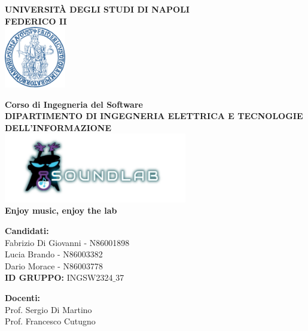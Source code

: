 \documentclass{article}
\begin{document}
	\begin{center}
		\textbf{UNIVERSITÀ DEGLI STUDI DI NAPOLI \\ FEDERICO II}
		\\
		\vspace{1cm}
		\includegraphics[width=0.2\textwidth]{Immagini/logo_universita.png} 
	\end{center}
	
	\vspace{1cm}
	
	\begin{center}
		\textbf{Corso di Ingegneria del Software} \\
		\vspace{0.5cm}
		\textbf{DIPARTIMENTO DI INGEGNERIA ELETTRICA E TECNOLOGIE DELL'INFORMAZIONE} \\
		\vspace{0.5cm}
		\includegraphics[width=0.6\textwidth]{Immagini/logo_sfondo} \\
		\textbf{\textcolor{dark_purple}{Enjoy music, enjoy the lab}}
		
	\end{center}
	
	\vspace{0.5cm}
	
	\begin{center}
		\textbf{Candidati:} \\
		Fabrizio Di Giovanni - N86001898 \\
		Lucia Brando - N86003382 \\
		Dario Morace - N86003778 \\
		\textbf{ID GRUPPO:} INGSW2324$\_$37\\
	\end{center}
	
	\vspace{0.5cm}
	
	\begin{center}
		\textbf{Docenti:} \\
		Prof. Sergio Di Martino \\
		Prof. Francesco Cutugno
	\end{center}
	
\end{document}
